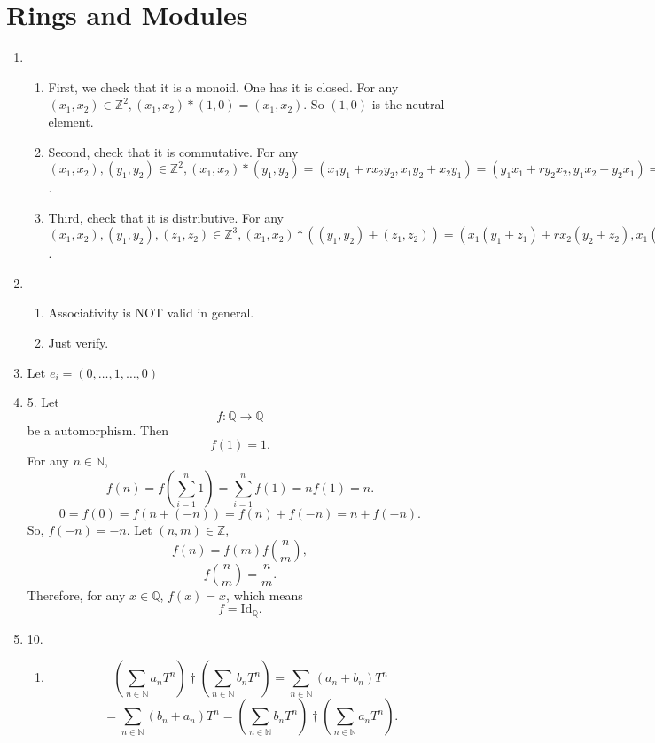 \documentclass[12pt]{article}
\newcommand{\NN}{\mathbb{N}}
\newcommand{\ZZ}{\mathbb{Z}}
\newcommand{\QQ}{\mathbb{Q}}
\begin{document}
\section{Rings and Modules}
\begin{enumerate}
    \item 
        \begin{enumerate}
            \item First, we check that it is a monoid. \newline One has it is closed. For any $(x_1,x_2)\in \ZZ^2, (x_1,x_2)*(1,0)=(x_1,x_2)$. So $(1,0)$ is the neutral element.
            \item Second, check that it is commutative. \newline For any $(x_1,x_2),(y_1,y_2)\in \ZZ^2, (x_1,x_2)*(y_1,y_2)=(x_1y_1+rx_2y_2,x_1y_2+x_2y_1)=(y_1x_1+ry_2x_2,y_1x_2+y_2x_1)=(y_1,y_2)*(x_1,x_2)$.
            \item Third, check that it is distributive. \newline For any $(x_1,x_2),(y_1,y_2),(z_1,z_2)\in \ZZ^3, (x_1,x_2)*((y_1,y_2)+(z_1,z_2))=(x_1(y_1+z_1)+rx_2(y_2+z_2),x_1(y_2+z_2)+x_2(y_1+z_1))=(x_1,x_2)*(y_1,y_2)+(x_1,x_2)*(z_1,z_2)$. 
        \end{enumerate}
    \item
        \begin{enumerate}
            \item Associativity is NOT valid in general.
            \item Just verify.
        \end{enumerate}
    \item Let $e_i=(0,\dots,1,\dots,0)$
    \item 5. Let $$f:\QQ\longrightarrow \QQ$$ be a automorphism. Then $$f(1)=1.$$
        For any $n\in\NN$, 
        $$f(n)=f\left(\sum_{i=1}^{n}1\right)=\sum_{i=1}^{n}f(1)=nf(1)=n.$$
        $$0=f(0)=f(n+(-n))=f(n)+f(-n)=n+f(-n).$$
        So, $f(-n)=-n$. Let $(n,m)\in \ZZ$,
        $$f(n)=f(m)f(\frac{n}{m}),$$
        $$f(\frac{n}{m})=\frac{n}{m}.$$
        Therefore, for any $x\in \QQ$, $f(x)=x$, which means 
        $$f=\mathrm{Id}_{\QQ}.$$
    \item 10.
        \begin{enumerate}
            \item $$\left(\sum_{n\in \NN}a_nT^n\right)\dagger \left(\sum_{n\in \NN}b_nT^n\right)=\sum_{n\in \NN}(a_n+b_n)T^n$$
            $$=\sum_{n\in \NN}(b_n+a_n)T^n=\left(\sum_{n\in \NN}b_nT^n\right)\dagger\left(\sum_{n\in \NN}a_nT^n\right).$$

\end{enumerate}
\end{enumerate}
\end{document}
